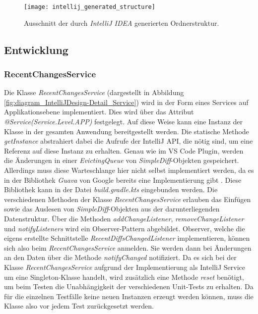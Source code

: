 \begin{figure}
    \centering
    \texttt{[image: intellij\_generated\_structure]}
    \caption{Ausschnitt der durch \emph{IntelliJ IDEA} generierten Ordnerstruktur.}
    \label{fig:intellij_generated_structure}
\end{figure}   

\subsection{Entwicklung}

\subsubsection{RecentChangesService}

Die Klasse \emph{RecentChangesService} (dargestellt in
Abbildung \ref{fig:diagram_IntelliJDesign-Detail_Service}) 
wird in der Form eines
Services auf Applikationsebene implementiert. Dies wird 
über das Attribut \emph{@Service(Service.Level.APP)} festgelegt. 
Auf diese Weise kann eine Instanz der Klasse in der gesamten Anwendung
bereitgestellt werden. Die statische Methode \emph{getInstance}
abstrahiert dabei die Aufrufe der IntelliJ API, die nötig sind, um eine
Referenz auf diese Instanz zu erhalten. Genau wie im VS Code Plugin,
werden die Änderungen in einer \emph{EvictingQueue} von 
\emph{SimpleDiff}-Objekten gespeichert. Allerdings muss diese
Warteschlange hier nicht selbst implementiert werden, da es in
der Bibliothek \emph{Guava} von Google bereits eine 
Implementierung gibt \cite{GuavaGitHub}.
Diese Bibliothek kann 
in der Datei \emph{build.gradle.kts} eingebunden werden.
Die verschiedenen Methoden der Klasse \emph{RecentChangesService} erlauben
das Einfügen sowie das Auslesen von \emph{SimpleDiff}-Objekten aus
der darunterliegenden Datenstruktur. Über die Methoden \emph{addChangeListener},
\emph{removeChangeListener} und \emph{notifyListeners} wird ein Observer-Pattern
abgebildet. Observer, welche die eigens erstellte Schnittstelle 
\emph{RecentDiffsChangedListener} implementieren, können sich also
beim \emph{RecentChangesService} anmelden. Sie werden dann bei Änderungen 
an den Daten über die Methode \emph{notifyChanged} notifiziert.
Da es sich bei der Klasse \emph{RecentChangesService} aufgrund der Implementierung
als IntelliJ Service um eine Singleton-Klasse \cite{2005Dp:e}
handelt, wird zusätzlich eine Methode \emph{reset} benötigt, um beim Testen
die Unabhängigkeit der verschiedenen Unit-Tests zu erhalten. Da für
die einzelnen Testfälle keine neuen Instanzen erzeugt werden können, muss
die Klasse also vor jedem Test zurückgesetzt werden.

